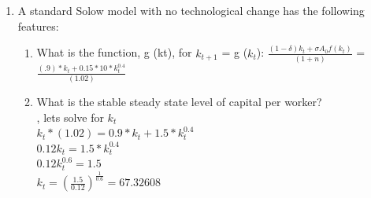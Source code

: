 \documentclass[12pt,oneside,reqno]{amsart}
\begin{document}
\begin{enumerate}
    \item A standard Solow model with no technological change has the following features:
    \begin{enumerate}
        \item What is the function, g (kt), for $k_{t+1}$ = g ($k_t$): $\frac{(1-\delta)k_t+\sigma A_0 f(k_t)}{(1+n)}$ = $\frac{(.9)*k_t+0.15*10 *k_t^{0.4}}{(1.02)}$
        \item What is the stable steady state level of capital per worker? \\
        $ $, lets solve for $k_t$ \\
        $k_t*(1.02) = 0.9*k_t+1.5*k_t^{0.4}$\\
        $0.12k_t=1.5*k_t^{0.4}$\\
        $0.12k_t^{0.6}=1.5$\\
        $k_t=(\frac{1.5}{0.12})^{\frac{1}{0.6}}=67.32608$
        

\end{enumerate}
\end{enumerate}
\end{document}
